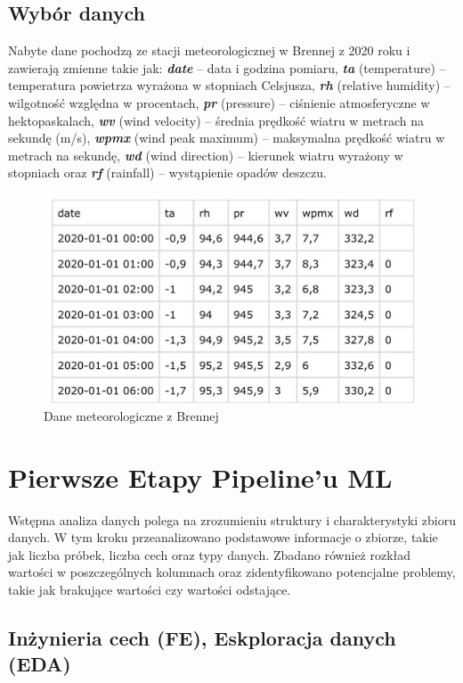 \documentclass[10pt,a4paper]{article}
\begin{document}
\subsection*{Wybór danych}
Nabyte dane pochodzą ze stacji meteorologicznej w Brennej z 2020 roku i zawierają zmienne takie jak: 
\textbf{\textit{date}} – data i godzina pomiaru, 
\textbf{\textit{ta}} (temperature) – temperatura powietrza wyrażona w stopniach Celsjusza, 
\textbf{\textit{rh}} (relative humidity) – wilgotność względna w procentach, 
\textbf{\textit{pr}} (pressure) – ciśnienie atmosferyczne w hektopaskalach, 
\textbf{\textit{wv}} (wind velocity) – średnia prędkość wiatru w metrach na sekundę (m/s), 
\textbf{\textit{wpmx}} (wind peak maximum) – maksymalna prędkość wiatru w metrach na sekundę, 
\textbf{\textit{wd}} (wind direction) – kierunek wiatru wyrażony w stopniach oraz 
\textbf{\textit{rf}} (rainfall) – wystąpienie opadów deszczu.
\begin{figure}[h]
	\centering
	\includegraphics[scale=0.4]{Image.jpg}
	\caption{Dane meteorologiczne z Brennej}
	\label{fig:my_label}
\end{figure}

\newpage
\section{Pierwsze Etapy Pipeline'u ML}
Wstępna analiza danych polega na zrozumieniu struktury i charakterystyki zbioru danych. W tym kroku przeanalizowano podstawowe informacje o zbiorze, takie jak liczba próbek, liczba cech oraz typy danych. Zbadano również rozkład wartości w poszczególnych kolumnach oraz zidentyfikowano potencjalne problemy, takie jak brakujące wartości czy wartości odstające.

\vspace{1.5em} 

\subsection{Inżynieria cech (FE), Eskploracja danych (EDA)}
\vspace{1.5em} 
\end{document}
